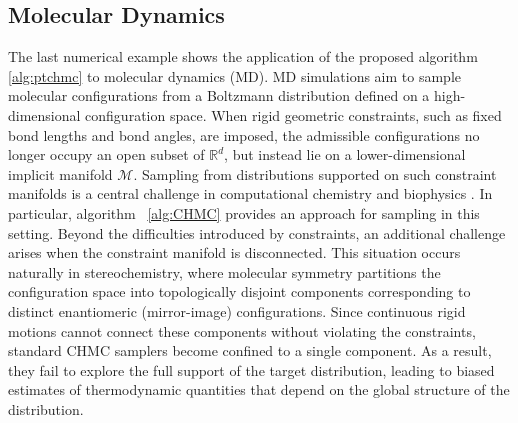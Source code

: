 \documentclass[12pt]{article}
\begin{document}
\subsection{Molecular Dynamics}
\label{C3}

The last numerical example shows the application of the proposed algorithm \ref{alg:ptchmc} to molecular dynamics (MD). MD simulations aim to sample molecular configurations from a Boltzmann distribution defined on a high-dimensional configuration space. When rigid geometric constraints, such as fixed bond lengths and bond angles, are imposed, the admissible configurations no longer occupy an open subset of $\mathbb{R}^d$, but instead lie on a lower-dimensional implicit manifold $\mathcal{M}$. Sampling from distributions supported on such constraint manifolds is a central challenge in computational chemistry and biophysics \citep{J28, J29}. In particular, algorithm ~\ref{alg:CHMC} provides an approach for sampling in this setting.
Beyond the difficulties introduced by constraints, an additional challenge arises when the constraint manifold is disconnected. This situation occurs naturally in stereochemistry, where molecular symmetry partitions the configuration space into topologically disjoint components corresponding to distinct enantiomeric (mirror-image) configurations. Since continuous rigid motions cannot connect these components without violating the constraints, standard CHMC samplers become confined to a single component. As a result, they fail to explore the full support of the target distribution, leading to biased estimates of thermodynamic quantities that depend on the global structure of the distribution.
\end{document}

